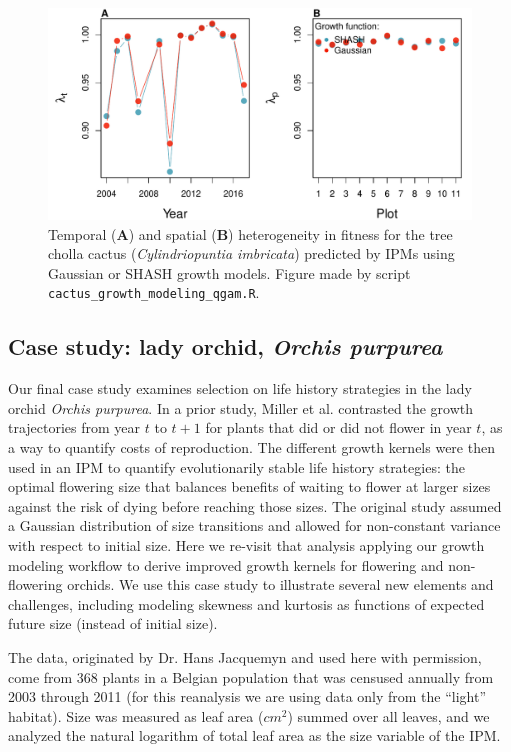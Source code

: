 \documentclass[12pt]{article}
\begin{document}
\begin{figure}[tbp]
	\centering
	\includegraphics[width=1.0\textwidth]{figures/cactus_lambda_years_plots.pdf}
	\caption{Temporal (\textbf{A}) and spatial (\textbf{B}) heterogeneity in fitness for the tree cholla cactus (\textit{Cylindriopuntia imbricata}) predicted by IPMs using Gaussian or SHASH growth models. Figure made by script \texttt{cactus\_growth\_modeling\_qgam.R}.}
	\label{fig:cactus_lambda}
\end{figure} 

 
\subsection{Case study: lady orchid, \emph{Orchis purpurea}}
Our final case study examines selection on life history strategies in the lady orchid \textit{Orchis purpurea}. 
In a prior study, Miller et al. \citeyear{miller2012evolutionary} contrasted the growth trajectories from year $t$ to $t+1$ for plants that did or did not flower in year $t$, as a way to quantify costs of reproduction. 
The different growth kernels were then used in an IPM to quantify evolutionarily stable life history strategies: the optimal flowering size that balances benefits of waiting to flower at larger sizes against the risk of dying before reaching those sizes. 
The original study assumed a Gaussian distribution of size transitions and allowed for non-constant variance with respect to initial size. 
Here we re-visit that analysis applying our growth modeling workflow to derive improved growth kernels for flowering and non-flowering orchids. 
We use this case study to illustrate several new elements and challenges, including modeling skewness and kurtosis as functions of expected future size (instead of initial size).

The data, originated by Dr. Hans Jacquemyn and used here with permission, come from 368 plants in a Belgian population that was censused annually from 2003 through 2011 (for this reanalysis we are using data only from the ``light'' habitat). 
Size was measured as leaf area ($cm^2$) summed over all leaves, and we analyzed the natural logarithm of total leaf area as the size variable of the IPM. 
\end{document}
